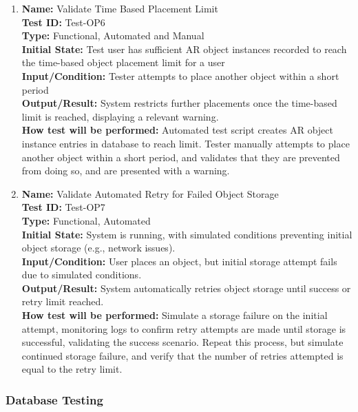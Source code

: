 \documentclass[12pt, titlepage]{article}
\begin{document}
\begin{enumerate}
  \item \textbf{Name:} Validate Time Based Placement Limit \label{itm:Test-OP6} \\
        \textbf{Test ID:} Test-OP6 \\
        \textbf{Type:} Functional, Automated and Manual \\
        \textbf{Initial State:} Test user has sufficient AR object instances recorded to reach the time-based object placement limit for a user \\
        \textbf{Input/Condition:} Tester attempts to place another object within a short period \\
        \textbf{Output/Result:} System restricts further placements once the time-based limit is reached, displaying a relevant warning. \\
        \textbf{How test will be performed:} Automated test script creates AR object instance entries in database to reach limit. Tester manually attempts to place another object within a short period, and validates that they are prevented from doing so, and are presented with a warning.

  \item \textbf{Name:} Validate Automated Retry for Failed Object Storage \label{itm:Test-OP7} \\
        \textbf{Test ID:} Test-OP7 \\
        \textbf{Type:} Functional, Automated \\
        \textbf{Initial State:} System is running, with simulated conditions preventing initial object storage (e.g., network issues). \\
        \textbf{Input/Condition:} User places an object, but initial storage attempt fails due to simulated conditions. \\
        \textbf{Output/Result:} System automatically retries object storage until success or retry limit reached. \\
        \textbf{How test will be performed:} Simulate a storage failure on the initial attempt, monitoring logs to confirm retry attempts are made until storage is successful, validating the success scenario. Repeat this process, but simulate continued storage failure, and verify that the number of retries attempted is equal to the retry limit.

\end{enumerate}

\subsubsection{Database Testing}
\end{document}
